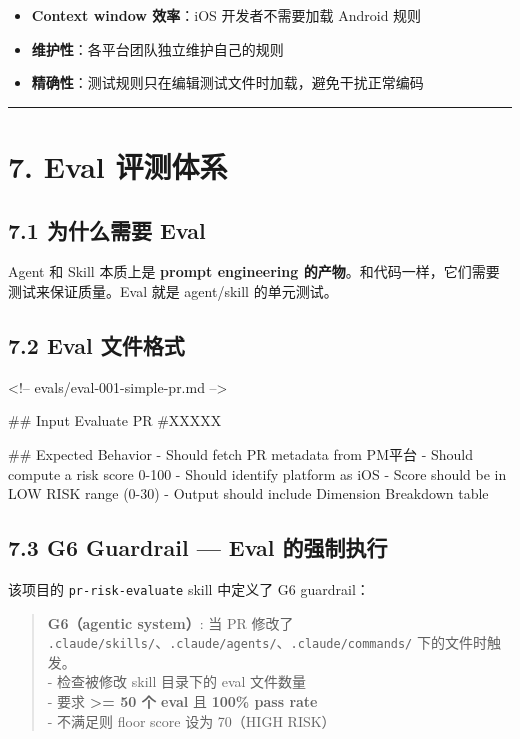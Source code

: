 \begin{itemize}[leftmargin=2em]
\item \textbf{Context window 效率}：iOS 开发者不需要加载 Android 规则
\item \textbf{维护性}：各平台团队独立维护自己的规则
\item \textbf{精确性}：测试规则只在编辑测试文件时加载，避免干扰正常编码
\end{itemize}

\bigskip\hrule\bigskip

\section{7. Eval 评测体系}

\subsection{7.1 为什么需要 Eval}

Agent 和 Skill 本质上是 \textbf{prompt engineering 的产物}。和代码一样，它们需要测试来保证质量。Eval 就是 agent/skill 的单元测试。


\subsection{7.2 Eval 文件格式}

\begin{codeblock}
<!-- evals/eval-001-simple-pr.md -->

## Input
Evaluate PR #XXXXX

## Expected Behavior
- Should fetch PR metadata from PM平台
- Should compute a risk score 0-100
- Should identify platform as iOS
- Score should be in LOW RISK range (0-30)
- Output should include Dimension Breakdown table
\end{codeblock}

\subsection{7.3 G6 Guardrail --- Eval 的强制执行}

该项目的 \texttt{pr-risk-evaluate} skill 中定义了 G6 guardrail：


\begin{quote}
\textbf{G6（agentic system）}: 当 PR 修改了 \texttt{.claude/skills/}、\texttt{.claude/agents/}、\texttt{.claude/commands/} 下的文件时触发。\\
- 检查被修改 skill 目录下的 eval 文件数量\\
- 要求 \textbf{>= 50 个 eval} 且 \textbf{100\% pass rate}\\
- 不满足则 floor score 设为 70（HIGH RISK）\\
\end{quote}

